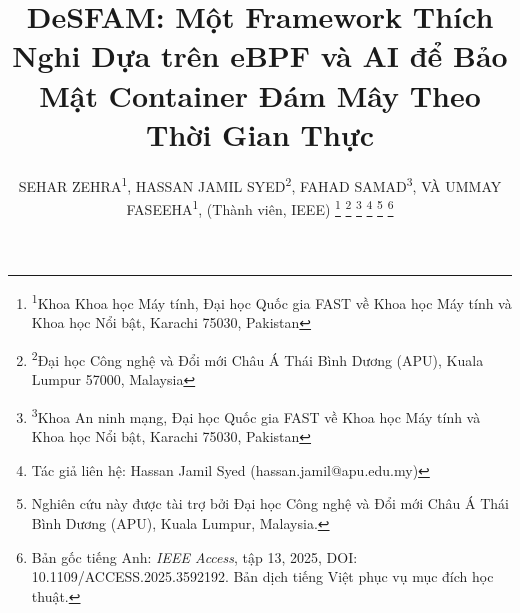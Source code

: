 \documentclass[journal,10pt,twoside]{IEEEtran}
\begin{document}
\title{DeSFAM: Một Framework Thích Nghi Dựa trên eBPF và AI để Bảo Mật Container Đám Mây Theo Thời Gian Thực}

\author{SEHAR ZEHRA\textsuperscript{1},
HASSAN JAMIL SYED\textsuperscript{2},
FAHAD SAMAD\textsuperscript{3},
VÀ UMMAY FASEEHA\textsuperscript{1}, (Thành viên, IEEE)
\thanks{\textsuperscript{1}Khoa Khoa học Máy tính, Đại học Quốc gia FAST về Khoa học Máy tính và Khoa học Nổi bật, Karachi 75030, Pakistan}
\thanks{\textsuperscript{2}Đại học Công nghệ và Đổi mới Châu Á Thái Bình Dương (APU), Kuala Lumpur 57000, Malaysia}
\thanks{\textsuperscript{3}Khoa An ninh mạng, Đại học Quốc gia FAST về Khoa học Máy tính và Khoa học Nổi bật, Karachi 75030, Pakistan}
\thanks{Tác giả liên hệ: Hassan Jamil Syed (hassan.jamil@apu.edu.my)}
\thanks{Nghiên cứu này được tài trợ bởi Đại học Công nghệ và Đổi mới Châu Á Thái Bình Dương (APU), Kuala Lumpur, Malaysia.}
\thanks{Bản gốc tiếng Anh: \textit{IEEE Access}, tập 13, 2025, DOI: 10.1109/ACCESS.2025.3592192. Bản dịch tiếng Việt phục vụ mục đích học thuật.}
}

\maketitle













\end{document}
